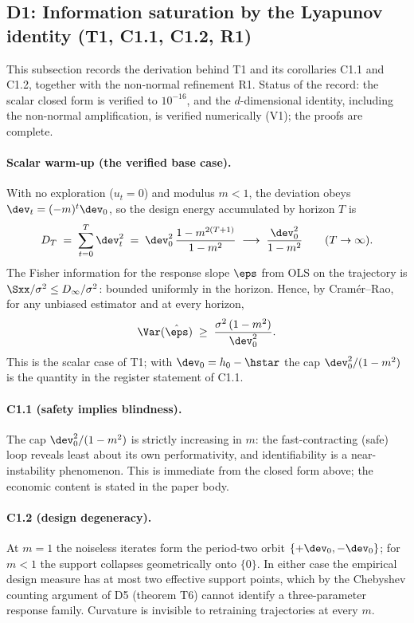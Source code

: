 \subsection*{D1: Information saturation by the Lyapunov identity (T1, C1.1, C1.2, R1)}

This subsection records the derivation behind T1 and its corollaries C1.1 and
C1.2, together with the non-normal refinement R1. Status of the record: the
scalar closed form is verified to $10^{-16}$, and the $d$-dimensional
identity, including the non-normal amplification, is verified numerically
(V1); the proofs are complete.

\paragraph{Scalar warm-up (the verified base case).}
With no exploration ($u_t = 0$) and modulus $m < 1$, the deviation obeys
$\dev_t = (-m)^t \dev_0$, so the design energy accumulated by horizon $T$ is
\begin{equation*}
D_T \;=\; \sum_{t=0}^{T} \dev_t^2
\;=\; \dev_0^2\,\frac{1 - m^{2(T+1)}}{1 - m^2}
\;\longrightarrow\; \frac{\dev_0^2}{1 - m^2}
\qquad (T \to \infty).
\end{equation*}
The Fisher information for the response slope $\eps$ from OLS on the
trajectory is $\Sxx/\sigma^2 \le D_\infty/\sigma^2$: bounded uniformly in
the horizon. Hence, by Cram\'er--Rao, for any unbiased estimator and at
every horizon,
\begin{equation*}
\Var(\hat\eps) \;\ge\; \frac{\sigma^2\,(1 - m^2)}{\dev_0^2}.
\end{equation*}
This is the scalar case of T1; with $\dev_0 = h_0 - \hstar$ the cap
$\dev_0^2/(1-m^2)$ is the quantity in the register statement of C1.1.

\paragraph{C1.1 (safety implies blindness).}
The cap $\dev_0^2/(1-m^2)$ is strictly increasing in $m$: the
fast-contracting (safe) loop reveals least about its own performativity, and
identifiability is a near-instability phenomenon. This is immediate from the
closed form above; the economic content is stated in the paper body.

\paragraph{C1.2 (design degeneracy).}
At $m = 1$ the noiseless iterates form the period-two orbit
$\{+\dev_0, -\dev_0\}$; for $m < 1$ the support collapses geometrically onto
$\{0\}$. In either case the empirical design measure has at most two
effective support points, which by the Chebyshev counting argument of D5
(theorem T6) cannot identify a three-parameter response family. Curvature is
invisible to retraining trajectories at every $m$.

